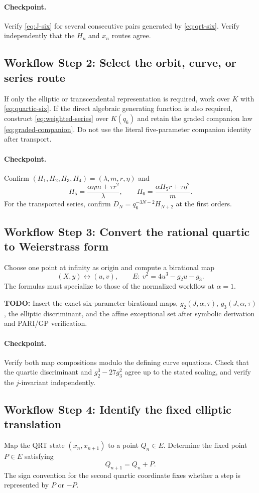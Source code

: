 \documentclass[11pt]{article}
\newcommand{\workflowstep}[1]{\subsection{Workflow Step #1}}
\newcommand{\taupar}{\tau}
\newcommand{\TODO}[1]{\par\noindent\textcolor{red!70!black}{\textbf{TODO:} #1}\par}
\begin{document}
\paragraph{Checkpoint.}
Verify \cref{eq:J-six} for several consecutive pairs generated by
\cref{eq:qrt-six}.  Verify independently that the $H_n$ and $x_n$ routes agree.

\workflowstep{2: Select the orbit, curve, or series route}
If only the elliptic or transcendental representation is required, work over
$K$ with \cref{eq:quartic-six}.  If the direct algebraic generating function is
also required, construct \cref{eq:weighted-series} over $K(q_6)$ and retain the
graded companion law \cref{eq:graded-companion}.  Do not use the literal
five-parameter companion identity after transport.

\paragraph{Checkpoint.}
Confirm $(H_1,H_2,H_3,H_4)=(\lambda,m,r,\eta)$ and
\[
 H_5=\frac{\alpha\eta m+\taupar r^2}{\lambda},\qquad
 H_6=\frac{\alpha H_5r+\taupar\eta^2}{m}.
\]
For the transported series, confirm $D_N=q_6^{-3N-2}H_{N+2}$ at the first
orders.

\workflowstep{3: Convert the rational quartic to Weierstrass form}
Choose one point at infinity as origin and compute a birational map
\begin{equation}
 (X,y)\longleftrightarrow(u,v),\qquad
 E:\ v^2=4u^3-g_2u-g_3.
 \label{eq:weierstrass-general}
\end{equation}
The formulas must specialize to those of the normalized workflow at
$\alpha=1$.

\TODO{Insert the exact six-parameter birational maps, $g_2(J,\alpha,\taupar)$,
$g_3(J,\alpha,\taupar)$, the elliptic discriminant, and the affine exceptional
set after symbolic derivation and PARI/GP verification.}

\paragraph{Checkpoint.}
Verify both map compositions modulo the defining curve equations.  Check that
the quartic discriminant and $g_2^3-27g_3^2$ agree up to the stated scaling,
and verify the $j$-invariant independently.

\workflowstep{4: Identify the fixed elliptic translation}
Map the QRT state $(x_n,x_{n+1})$ to a point $Q_n\in E$.  Determine the fixed
point $P\in E$ satisfying
\begin{equation}
 Q_{n+1}=Q_n+P.
 \label{eq:translation}
\end{equation}
The sign convention for the second quartic coordinate fixes whether a step is
represented by $P$ or $-P$.
\end{document}
